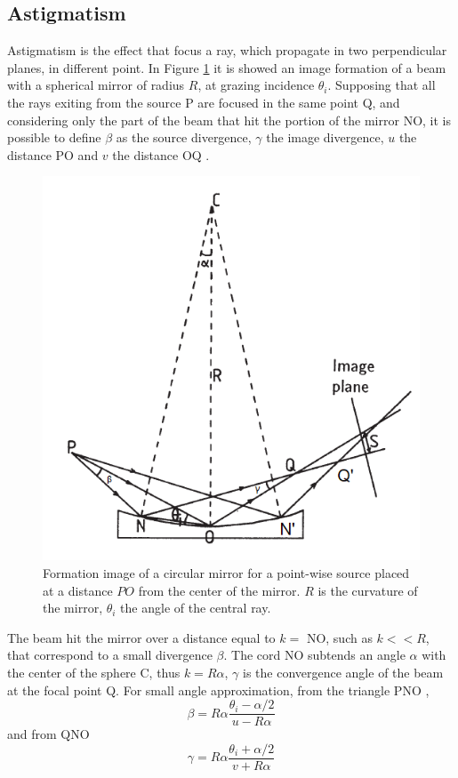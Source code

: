 \subsection{Astigmatism}
Astigmatism is the effect that focus a ray, which propagate in two perpendicular planes, in different point. In Figure \ref{fig: System1} it is showed an image formation of a beam with a spherical mirror of radius $R $, at grazing incidence $\theta_i $. Supposing that all the rays exiting from the source P are focused in the same point Q, and considering only the part of the beam that hit the portion of the mirror NO, it is possible to define $\beta $ as the source divergence, $\gamma $ the image divergence, $u $ the distance PO and $v $ the distance OQ .
\begin{figure}[]
%
\centering
%
\includegraphics[width=.6\textwidth]{Immagini/Chapter2/System1}
%
\caption{Formation image of a circular mirror for a point-wise source placed at a distance $PO $ from the center of the mirror. $R $ is the curvature of the mirror, $\theta_i $ the angle of the central ray.}
%
\label{fig: System1}
%
\end{figure}
\noindent The beam hit the mirror over a distance equal to $k = $ NO, such as $k<<R $, that correspond to a small divergence $\beta $. The cord NO subtends an angle $\alpha $ with the center of the sphere C, thus $k = R \alpha $, $\gamma $ is the convergence angle of the beam at the focal point Q. For small angle approximation, from the triangle PNO ,
\begin{equation}
\beta = R \alpha \frac{\theta_i - \alpha / 2}{u - R \alpha}
\label{eq: beta}
\end{equation}
\noindent and from QNO
\begin{equation}
\gamma = R \alpha \frac{\theta_i + \alpha / 2}{v + R \alpha}
\label{eq: gamme}
\end{equation}
